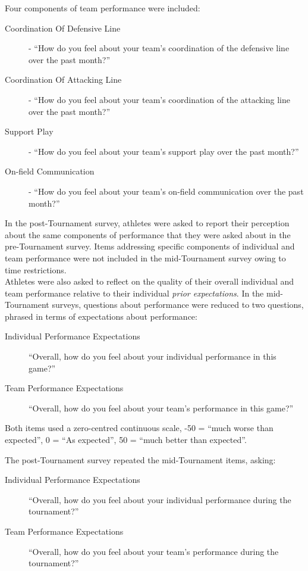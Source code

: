 Four components of team performance were included:
\begin{description}
\item[Coordination Of Defensive Line] - ``How do you feel about your team's coordination of the defensive line over the past month?''
\item[Coordination Of Attacking Line] - ``How do you feel about your team's coordination of the attacking line over the past month?''
\item[Support Play] - ``How do you feel about your team's support play over the past month?''
\item[On-field Communication] - ``How do you feel about your team's on-field communication over the past month?''
\end{description}

In the post-Tournament survey, athletes were asked to report their perception about the same components of performance that they were asked about in the pre-Tournament survey. Items addressing specific components of individual and team performance were not included in the mid-Tournament survey owing to time restrictions. \\


Athletes were also asked to reflect on the quality of their overall individual and team performance relative to their individual \textit{prior expectations}. In the mid-Tournament surveys, questions about performance were reduced to two questions, phrased in terms of expectations about performance:

\begin{description}
\item [Individual Performance Expectations]``Overall, how do you feel about your individual performance in this game?''
\item [Team Performance Expectations] ``Overall, how do you feel about your team's performance in this game?''
\end{description}
Both items used a zero-centred continuous scale, -50 = ``much worse than expected'', 0 =  ``As expected'', 50 =  ``much better than expected''.

The post-Tournament survey repeated the mid-Tournament items, asking:
\begin{description}
\item [Individual Performance Expectations] ``Overall, how do you feel about your individual performance during the tournament?''
\item [Team Performance Expectations]``Overall, how do you feel about your team's performance during the tournament?''
\end{description}

